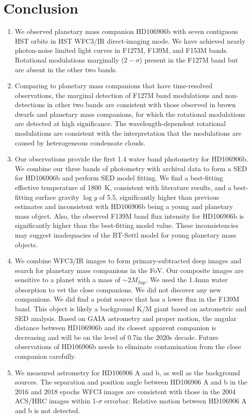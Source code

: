 \documentclass[twocolumn]{aastex62}
\newcommand{\mjup}{\ensuremath{M_\mathrm{Jup}}\xspace}
\begin{document}
\section{Conclusion}

\begin{enumerate}
\item We observed planetary mass companion HD106906b with seven contiguous HST orbits in HST WFC3/IR direct-imaging mode. We have achieved nearly photon-noise limited  light curves in F127M, F139M, and F153M bands. Rotational modulations marginally ($2-\sigma$) present in the F127M band but are absent in the other two bands.

\item Comparing to planetary mass companions that have time-resolved observations, the marginal detection of  F127M band modulations and non-detections in other two bands are consistent with those observed in brown dwarfs and planetary mass companions, for which the rotational modulations are detected at high significance. The wavelength-dependent rotational modulations are consistent with the interpretation that the modulations are caused by heterogeneous condensate clouds.

\item Our observations provide the first 1.4 \micron water band photometry for HD106906b. We combine our three bands of photometry with archival data to form a SED for HD106906b and perform SED model fitting. We find a best-fitting effective temperature of 1800~K, consistent with literature results, and a best-fitting surface gravity $\log g$ of 5.5,  significantly higher than previous estimates and inconsistent with HD106906b being a young and planetary mass object. Also, the observed F139M band flux intensity for HD106906b is significantly higher than the best-fitting model value. These inconsistencies may suggest inadequacies of the BT-Settl model for young planetary mass objects.

\item We combine WFC3/IR images to form primary-subtracted deep images and search for planetary mass companions in the FoV. Our composite images are sensitive to a planet with a mass of $\sim 2 \mjup$. We used the 1.4mm water absorption to vet the close companions. We did not discover  any new companions. We did find a point source that has a lower flux in the F139M band. This object is likely a background K/M giant based on astrometric and SED analysis.  Based on GAIA astrometry and proper motion, the angular distance between HD106906b and its closest apparent companion is decreasing and will be on the level of 0.7\arcsec  in the 2020s decade. Future observations of HD106906b needs to eliminate contamination from the close companion carefully.

\item We measured astrometry for HD106906 A and b, as well as the background sources. The separation and position angle between HD106906 A and b in the 2016 and 2018 epochs WFC3 images are consistent with those in the 2004 ACS/HRC images within 1-$\sigma$ errorbar. Relative motion between HD106906 A and b is not detected. 
\end{enumerate}
\end{document}
